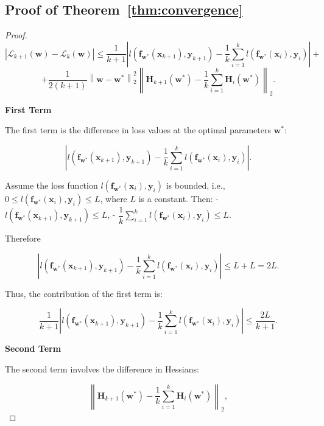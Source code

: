 \documentclass{article}
\begin{document}
\subsection{Proof of Theorem~\ref{thm:convergence}}\label{app:proof_convergence}
\begin{proof}
    

\[
\left| \mathcal{L}_{k+1}(\mathbf{w}) - \mathcal{L}_k(\mathbf{w}) \right| \leqslant \dfrac{1}{k+1} \left| l(\mathbf{f}_{\mathbf{w}^*}(\mathbf{x}_{k+1}), \mathbf{y}_{k+1}) - \dfrac{1}{k} \sum_{i=1}^{k} l(\mathbf{f}_{\mathbf{w}^*}(\mathbf{x}_{i}), \mathbf{y}_{i}) \right| +
\]
\[
+ \dfrac{1}{2 (k+1)} \left\| \mathbf{w} - \mathbf{w}^* \right\|_2^2 \left\| \mathbf{H}_{k+1}(\mathbf{w}^*) - \dfrac{1}{k} \sum_{i=1}^{k} \mathbf{H}_i(\mathbf{w}^*) \right\|_2.
\]

\textbf{First Term}

The first term is the difference in loss values at the optimal parameters \(\mathbf{w}^*\):

\[
\left| l(\mathbf{f}_{\mathbf{w}^*}(\mathbf{x}_{k+1}), \mathbf{y}_{k+1}) - \dfrac{1}{k} \sum_{i=1}^{k} l(\mathbf{f}_{\mathbf{w}^*}(\mathbf{x}_{i}), \mathbf{y}_{i}) \right|.
\]

Assume the loss function \(l(\mathbf{f}_{\mathbf{w}^*}(\mathbf{x}_i), \mathbf{y}_i)\) is bounded, i.e., \(0 \leqslant l(\mathbf{f}_{\mathbf{w}^*}(\mathbf{x}_i), \mathbf{y}_i) \leqslant L\), where \(L\) is a constant. Then:
- \(l(\mathbf{f}_{\mathbf{w}^*}(\mathbf{x}_{k+1}), \mathbf{y}_{k+1}) \leqslant L\),
- \(\dfrac{1}{k} \sum_{i=1}^{k} l(\mathbf{f}_{\mathbf{w}^*}(\mathbf{x}_{i}), \mathbf{y}_{i}) \leqslant L\).

Therefore

\[
\left| l(\mathbf{f}_{\mathbf{w}^*}(\mathbf{x}_{k+1}), \mathbf{y}_{k+1}) - \dfrac{1}{k} \sum_{i=1}^{k} l(\mathbf{f}_{\mathbf{w}^*}(\mathbf{x}_{i}), \mathbf{y}_{i}) \right| \leqslant L + L = 2L.
\]

Thus, the contribution of the first term is:

\[
\dfrac{1}{k+1} \left| l(\mathbf{f}_{\mathbf{w}^*}(\mathbf{x}_{k+1}), \mathbf{y}_{k+1}) - \dfrac{1}{k} \sum_{i=1}^{k} l(\mathbf{f}_{\mathbf{w}^*}(\mathbf{x}_{i}), \mathbf{y}_{i}) \right| \leqslant \dfrac{2L}{k+1}.
\]


\textbf{Second Term}

The second term involves the difference in Hessians:

\[
\left\| \mathbf{H}_{k+1}(\mathbf{w}^*) - \dfrac{1}{k} \sum_{i=1}^{k} \mathbf{H}_i(\mathbf{w}^*) \right\|_2,
\]


\end{proof}
\end{document}
